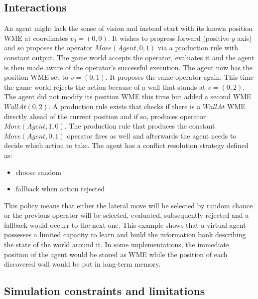 \subsection{Interactions}

An agent might lack the sense of vision and instead start with its known position WME at coordinates $v_0=(0, 0)$.
It wishes to progress forward (positive $y$ axis) and so proposes the operator $Move(Agent, 0, 1)$ via a production rule with constant output.
The game world accepts the operator, evaluates it and the agent is then made aware of the operator's successful execution.
The agent now has the position WME set to $v=(0, 1)$.
It proposes the same operator again.
This time the game world rejects the action because of a wall that stands at $v=(0, 2)$.
The agent did not modify its position WME this time but added a second WME $WallAt(0, 2)$.
A production rule exists that checks if there is a $WallAt$ WME directly ahead of the current position and if so, produces operator $Move(Agent, 1, 0)$.
The production rule that produces the constant $Move(Agent, 0, 1)$ operator fires as well and afterwards the agent needs to decide which action to take.
The agent has a conflict resolution strategy defined as:

\begin{itemize}
    \item choose random
    \item fallback when action rejected
\end{itemize}

This policy means that either the lateral move will be selected by random chance or the previous operator will be selected, evaluated, subsequently rejected and a fallback would occurr to the next one.
This example shows that a virtual agent possesses a limited capacity to learn and build the information bank describing the state of the world around it.
In some implementations, the immediate position of the agent would be stored as WME while the position of each discovered wall would be put in long-term memory.

\subsection{Simulation constraints and limitations}

